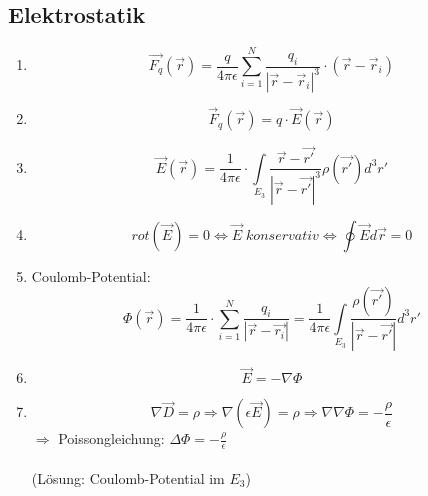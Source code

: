 \documentclass[a4paper,twocolumn,10pt]{article}
\begin{document}
\subsection{Elektrostatik}
\begin{enumerate}[label=$\bullet$]
\item
\begin{equation*}
\overrightarrow{F_q}(\overrightarrow{r})=\frac{q}{4\pi\epsilon}\sum\limits_{i=1}^{N}\frac{q_i}{|\overrightarrow{r}-\overrightarrow{r}_i|^3}\cdot (\overrightarrow{r}-\overrightarrow{r}_i)
\end{equation*}
\item
\begin{equation*}
\overrightarrow{F}_q(\overrightarrow{r})=q\cdot \overrightarrow{E}(\overrightarrow{r})
\end{equation*}
\item
\begin{equation*}
\overrightarrow{E}(\overrightarrow{r})=\frac{1}{4\pi\epsilon}\cdot\int\limits_{E_3}\frac{\overrightarrow{r}-\overrightarrow{r'}}{|\overrightarrow{r}-\overrightarrow{r'}|^3}\rho(\overrightarrow{r'})d^3r'
\end{equation*}
\item
\begin{equation*}
rot(\overrightarrow{E})=0\Leftrightarrow\overrightarrow{E}\;konservativ\Leftrightarrow\oint \overrightarrow{E}d\overrightarrow{r}=0
\end{equation*}
\item Coulomb-Potential:
\begin{equation*}
\Phi(\overrightarrow{r})=\frac{1}{4\pi\epsilon}\cdot\sum\limits_{i=1}^{N}\frac{q_i}{|\overrightarrow{r}-\overrightarrow{r_i}|}=\frac{1}{4\pi\epsilon}\int\limits_{E_3}\frac{\rho(\overrightarrow{r'})}{|\overrightarrow{r}-\overrightarrow{r'}|}d^3r'
\end{equation*}
\item 
\begin{equation*}
\overrightarrow{E}=-\nabla\Phi
\end{equation*}
\item
\begin{equation*}
\nabla\overrightarrow{D}=\rho\Rightarrow\nabla(\epsilon\overrightarrow{E})=\rho\Rightarrow\nabla\nabla\Phi=-\frac{\rho}{\epsilon}
\end{equation*}
$\Rightarrow$ Poissongleichung: $\Delta\Phi=-\frac{\rho}{\epsilon}$\\\\
(Lösung: Coulomb-Potential im $E_3$)

\end{enumerate}
\end{document}
